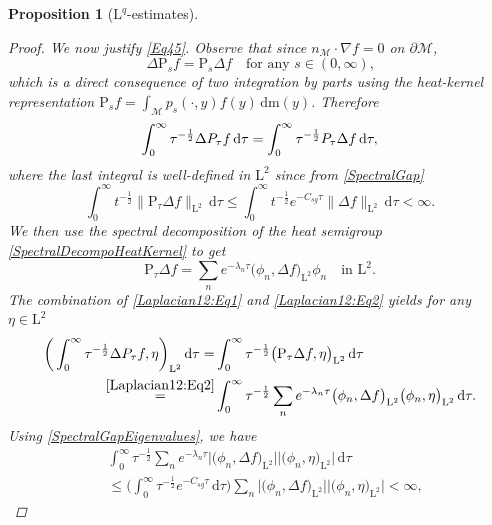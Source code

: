 \documentclass[11pt,a4paper,oneside]{amsart}
\numberwithin{equation}{section}
\newtheorem{proposition}[theorem]{Proposition}
\newcommand{\dd}{\mathrm{d}}
\newcommand{\LL}{\mathrm{L}}
\newcommand{\pp}{\mathrm{P}}
\newcommand{\m}{\mathrm{m}}
\begin{document}
\begin{proposition}[$\LL^{q}$-estimates]
\begin{proof}
We now justify \eqref{Eq45}. Observe that since $n_\mathcal{M}\cdot \nabla f=0$ on $\partial\mathcal{M}$,
%
\begin{equation}\label{Eq44}
\Delta \text{P}_s f=\text{P}_s\Delta f\quad \text{for any $s\in (0,\infty)$,}
\end{equation}
%
which is a direct consequence of two integration by parts using the heat-kernel representation $\text{P}_s f=\int_{\mathcal{M}}p_s(\cdot,y)f(y)\,\dd \m(y)$. Therefore 
%
\begin{equation}\label{Laplacian12:Eq1}
%
\int_{0}^{\infty}\tau^{-\frac{1}{2}}\Delta {\rm P}_{\tau} f\,\dd\tau=\int_{0}^{\infty}\tau^{-\frac{1}{2}}{\rm P}_{\tau} \Delta f\,\dd\tau,
%
\end{equation}
%
where the last integral is well-defined in $\LL^2$ since from \eqref{SpectralGap} 
%
$$\int_0^\infty t^{-\frac{1}{2}}\|\pp_\tau \Delta f\|_{\LL^2}\,\dd\tau\leq\int_0^\infty t^{-\frac{1}{2}}e^{-C_{sg}\tau}\|\Delta f\|_{\LL^2}\,\dd\tau<\infty.$$
%
We then use the spectral decomposition of the heat semigroup \eqref{SpectralDecompoHeatKernel} to get
%
\begin{equation}\label{Laplacian12:Eq2}
%
\pp_\tau \Delta f=\sum_{n} e^{-\lambda_n\tau}\big(\phi_n,\Delta f\big)_{\LL^2}\phi_n\quad\text{in $\LL^2$.}
%
\end{equation}
%
%
%
The combination of \eqref{Laplacian12:Eq1} and \eqref{Laplacian12:Eq2} yields for any $\eta\in \LL^2$
%
\begin{equation}\label{Laplacian12:Eq3}
%
\begin{aligned}
%
\bigg(\int_{0}^{\infty}\tau^{-\frac{1}{2}}\Delta {\rm P}_{\tau} f,\eta\bigg)_{\LL^{2}}\,\dd\tau=&\int_{0}^\infty \tau^{-\frac{1}{2}}\big(\pp_\tau\Delta f,\eta\big)_{\LL^2}\,\dd\tau\\
\stackrel{\eqref{Laplacian12:Eq2}}{=}&\int_{0}^{\infty}\tau^{-\frac{1}{2}}\sum_{n} e^{-\lambda_n\tau}\big(\phi_n,\Delta f\big)_{\LL^2}\big(\phi_n,\eta\big)_{\LL^{2}}\,\dd\tau.
%
\end{aligned}
%
\end{equation}
%
Using \eqref{SpectralGapEigenvalues}, we have
%
\begin{align*}
%
&\int_{0}^\infty \tau^{-\frac{1}{2}}\sum_n e^{-\lambda_n\tau}\vert\big(\phi_n,\Delta f\big)_{\LL^2}\vert\vert \big(\phi_n,\eta\big)_{\LL^2}\vert\,\dd\tau\\
&\leq \Big(\int_{0}^\infty  \tau^{-\frac{1}{2}}e^{-C_{sg}\tau}\,\dd\tau\Big)\sum_{n}\vert\big(\phi_n,\Delta f\big)_{\LL^2}\vert\vert \big(\phi_n,\eta\big)_{\LL^2}\vert<\infty,

\end{align*}
\end{proof}
\end{proposition}
\end{document}
